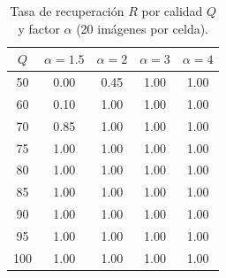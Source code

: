 \begin{table}[H]
\centering
\scriptsize
\caption{Tasa de recuperación $R$ por calidad $Q$ y factor $\alpha$ (20 imágenes por celda).}
\label{tab:recuperacion}
\begin{tabular}{|c|c|c|c|c|}
\hline
\rowcolor{uocnavy}
\color{white}\textbf{$Q$} &
\color{white}\textbf{$\alpha=1{.}5$} &
\color{white}\textbf{$\alpha=2$} &
\color{white}\textbf{$\alpha=3$} &
\color{white}\textbf{$\alpha=4$} \\
\hline
50 & 0{.}00 & 0{.}45 & 1{.}00 & 1{.}00 \\
\hline
60 & 0{.}10 & 1{.}00 & 1{.}00 & 1{.}00 \\
\hline
70 & 0{.}85 & 1{.}00 & 1{.}00 & 1{.}00 \\
\hline
75 & 1{.}00 & 1{.}00 & 1{.}00 & 1{.}00 \\
\hline
80 & 1{.}00 & 1{.}00 & 1{.}00 & 1{.}00 \\
\hline
85 & 1{.}00 & 1{.}00 & 1{.}00 & 1{.}00 \\
\hline
90 & 1{.}00 & 1{.}00 & 1{.}00 & 1{.}00 \\
\hline
95 & 1{.}00 & 1{.}00 & 1{.}00 & 1{.}00 \\
\hline
100 & 1{.}00 & 1{.}00 & 1{.}00 & 1{.}00 \\
\hline
\end{tabular}
\end{table}

